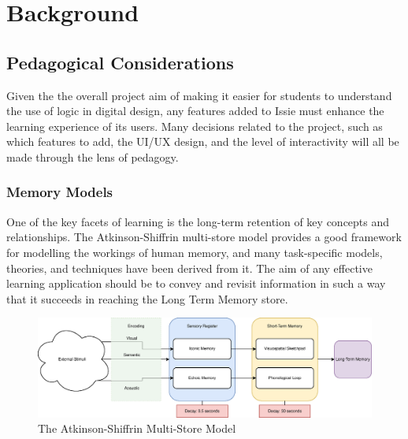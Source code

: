 \chapter{Background} \label{chap:background}

\section{Pedagogical Considerations} \label{sec:ped_cons}
Given  the the overall project aim of making it easier for students to understand the use of logic in digital design, any features added to Issie must enhance the learning experience of its users. Many decisions related to the project, such as which features to add, the UI/UX design, and the level of interactivity will all be made through the lens of pedagogy.
\subsection{Memory Models} \label{subsec:memmodels}
One of the key facets of learning is the long-term retention of key concepts and relationships. The Atkinson-Shiffrin multi-store model \cite{memory_model} provides a good framework for modelling the workings of human memory, and many task-specific models, theories, and techniques have been derived from it. The aim of any effective learning application should be to convey and revisit information in such a way that it succeeds in reaching the Long Term Memory store.

\begin{figure} [h]
    \centering
    \includegraphics[width=\textwidth]{02.Background/atkinson.eps}
    \caption{The Atkinson-Shiffrin Multi-Store Model}
    \label{fig:atkinson}
\end{figure}

